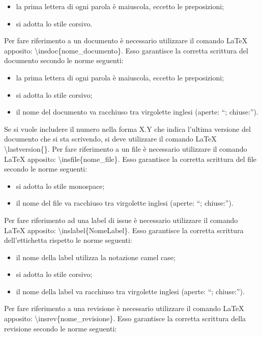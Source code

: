 						\begin{itemize}
							\item la prima lettera di ogni parola è maiuscola, eccetto le preposizioni;
							\item si adotta lo stile corsivo.
						\end{itemize}
						Per fare riferimento a un documento è necessario utilizzare il comando \LaTeX{} apposito: \textbackslash insdoc\{nome\_documento\}. Esso garantisce la corretta scrittura del documento secondo le norme seguenti:
						\begin{itemize}
							\item la prima lettera di ogni parola è maiuscola, eccetto le preposizioni;
							\item si adotta lo stile corsivo;
							\item il nome del documento va racchiuso tra virgolette inglesi (aperte: “; chiuse:”).
						\end{itemize}
						Se si vuole includere il numero nella forma X.Y che indica l’ultima versione del documento che si sta scrivendo, si deve utilizzare il comando \LaTeX{} \textbackslash lastversion\{\}.
						Per fare riferimento a un file è necessario utilizzare il comando \LaTeX{} apposito: \textbackslash insfile\{nome\_file\}. Esso garantisce la corretta scrittura del file secondo le norme seguenti:
						\begin{itemize}
							\item si adotta lo stile monospace;
							\item il nome del file va racchiuso tra virgolette inglesi (aperte: “; chiuse:”).
						\end{itemize}
						Per fare riferimento ad una label di issue è necessario utilizzare il comando \LaTeX{} apposito: \textbackslash inslabel\{NomeLabel\}. Esso garantisce la corretta scrittura dell'ettichetta rispetto le norme seguenti:
						\begin{itemize}
							\item il nome della label utilizza la notazione camel case;
							\item si adotta lo stile corsivo;
							\item il nome della label va racchiuso tra virgolette inglesi (aperte: “; chiuse:”).
						\end{itemize}
						Per fare riferimento a una revisione è necessario utilizzare il comando \LaTeX{} apposito: \textbackslash insrev\{nome\_revisione\}. Esso garantisce la corretta scrittura della revisione secondo le norme seguenti:
